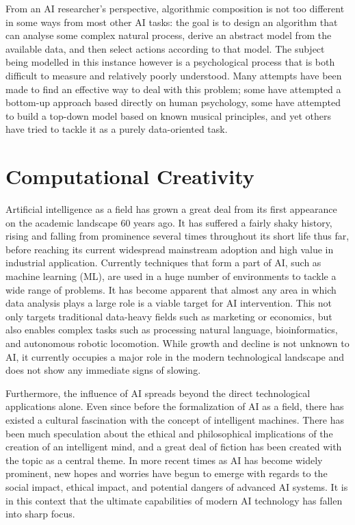 \documentclass[ author={Stephen Livermore-Tozer},
				supervisor={Dr. Peter Flach},
				degree={MEng},
				title={Performing Algorithmic Co-composition Using Machine Learning},
				subtitle={},
				type={research},
				year={2016} ]{dissertation}
\begin{document}
	From an AI researcher's perspective, algorithmic composition is not too different in some ways from most other AI tasks: the goal is to design an algorithm that can analyse some complex natural process, derive an abstract model from the available data, and then select actions according to that model. The subject being modelled in this instance however is a psychological process that is both difficult to measure and relatively poorly understood. Many attempts have been made to find an effective way to deal with this problem; some have attempted a bottom-up approach based directly on human psychology, some have attempted to build a top-down model based on known musical principles, and yet others have tried to tackle it as a purely data-oriented task.

	\section{Computational Creativity}
	
	Artificial intelligence as a field has grown a great deal from its first appearance on the academic landscape 60 years ago. It has suffered a fairly shaky history, rising and falling from prominence several times throughout its short life thus far, before reaching its current widespread mainstream adoption and high value in industrial application. Currently techniques that form a part of AI, such as machine learning (ML), are used in a huge number of environments to tackle a wide range of problems. It has become apparent that almost any area in which data analysis plays a large role is a viable target for AI intervention. This not only targets traditional data-heavy fields such as marketing or economics, but also enables complex tasks such as processing natural language, bioinformatics, and autonomous robotic locomotion. While growth and decline is not unknown to AI, it currently occupies a major role in the modern technological landscape and does not show any immediate signs of slowing.
	
	Furthermore, the influence of AI spreads beyond the direct technological applications alone. Even since before the formalization of AI as a field, there has existed a cultural fascination with the concept of intelligent machines. There has been much speculation about the ethical and philosophical implications of the creation of an intelligent mind, and a great deal of fiction has been created with the topic as a central theme. In more recent times as AI has become widely prominent, new hopes and worries have begun to emerge with regards to the social impact, ethical impact, and potential dangers of advanced AI systems. It is in this context that the ultimate capabilities of modern AI technology has fallen into sharp focus.
	
\end{document}
